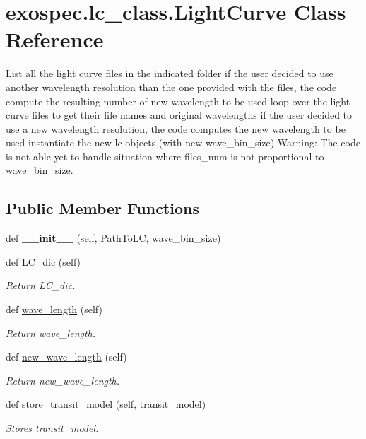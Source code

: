 \hypertarget{classexospec_1_1lc__class_1_1_light_curve}{}\section{exospec.\+lc\+\_\+class.\+Light\+Curve Class Reference}
\label{classexospec_1_1lc__class_1_1_light_curve}


List all the light curve files in the indicated folder if the user decided to use another wavelength resolution than the one provided with the files, the code compute the resulting number of new wavelength to be used loop over the light curve files to get their file names and original wavelengths if the user decided to use a new wavelength resolution, the code computes the new wavelength to be used instantiate the new lc objects (with new wave\+\_\+bin\+\_\+size) Warning\+: The code is not able yet to handle situation where files\+\_\+num is not proportional to wave\+\_\+bin\+\_\+size.  


\subsection*{Public Member Functions}
\begin{DoxyCompactItemize}
\item 
\mbox{\label{classexospec_1_1lc__class_1_1_light_curve_a231f0966a5321231cc9017956d7e037c}} 
def {\bfseries \+\_\+\+\_\+init\+\_\+\+\_\+} (self, Path\+To\+LC, wave\+\_\+bin\+\_\+size)
\item 
def \hyperlink{classexospec_1_1lc__class_1_1_light_curve_aa0feb2d525e844a5f010939b3a8e9ae9}{L\+C\+\_\+dic} (self)
\begin{DoxyCompactList}\small\item\em Return L\+C\+\_\+dic. \end{DoxyCompactList}\item 
def \hyperlink{classexospec_1_1lc__class_1_1_light_curve_a9da0e4bf8f9ea153afb534d63fb7d24a}{wave\+\_\+length} (self)
\begin{DoxyCompactList}\small\item\em Return wave\+\_\+length. \end{DoxyCompactList}\item 
def \hyperlink{classexospec_1_1lc__class_1_1_light_curve_a8af62f3180b7d965c9d02ad92b1f0089}{new\+\_\+wave\+\_\+length} (self)
\begin{DoxyCompactList}\small\item\em Return new\+\_\+wave\+\_\+length. \end{DoxyCompactList}\item 
def \hyperlink{classexospec_1_1lc__class_1_1_light_curve_aa71fe5f0926727ae236782c414a08a4b}{store\+\_\+transit\+\_\+model} (self, transit\+\_\+model)
\begin{DoxyCompactList}\small\item\em Stores transit\+\_\+model. \end{DoxyCompactList}\end{DoxyCompactItemize}
